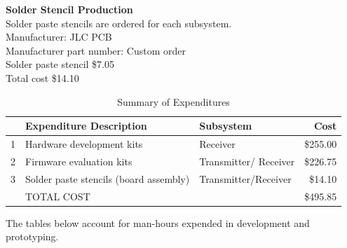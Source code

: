 \documentclass[12pt]{article}
\begin{document}
\noindent
\textbf{Solder Stencil Production}\\

\noindent
Solder paste stencils are ordered for each subsystem.\\
Manufacturer: JLC PCB\\
Manufacturer part number: Custom order\\
Solder paste stencil \$7.05\\
Total cost \$14.10

\hfill

\begin{table}[h!]
\centering
\caption{Summary of Expenditures}
\begin{tabular}{ | c | l | l | r | }
\hline
 & Expenditure Description &  Subsystem & Cost\\
\hline
1 & Hardware development kits & Receiver & \$255.00\\
\hline
2 & Firmware evaluation kits & Transmitter/ Receiver & \$226.75\\
\hline
3 & Solder paste stencils (board assembly) & Transmitter/Receiver & \$14.10\\
\hline 
 & TOTAL COST &  & \$495.85\\
\hline
\end{tabular}
\end{table}

\hfill
\pagebreak
\hfill

\indent
The tables below account for man-hours expended in development and prototyping.
\hfill
\end{document}
